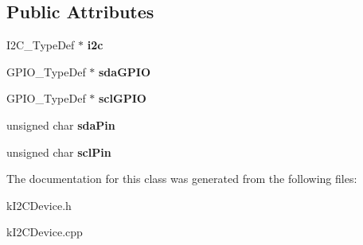 \subsection*{Public Attributes}
\begin{DoxyCompactItemize}
\item 
I2\+C\+\_\+\+Type\+Def $\ast$ {\bfseries i2c}\hypertarget{classkI2CDeviceHardware_ace7b414f13cbd3e93e904c661cc02e35}{}\label{classkI2CDeviceHardware_ace7b414f13cbd3e93e904c661cc02e35}

\item 
G\+P\+I\+O\+\_\+\+Type\+Def $\ast$ {\bfseries sda\+G\+P\+IO}\hypertarget{classkI2CDeviceHardware_af0228a16a473dfdd0f33ae6f60eb6cfc}{}\label{classkI2CDeviceHardware_af0228a16a473dfdd0f33ae6f60eb6cfc}

\item 
G\+P\+I\+O\+\_\+\+Type\+Def $\ast$ {\bfseries scl\+G\+P\+IO}\hypertarget{classkI2CDeviceHardware_ab4433caa4d8c1b7c460fd0c356ce87c0}{}\label{classkI2CDeviceHardware_ab4433caa4d8c1b7c460fd0c356ce87c0}

\item 
unsigned char {\bfseries sda\+Pin}\hypertarget{classkI2CDeviceHardware_ac244794bc64bf54acf12bc43242b7a13}{}\label{classkI2CDeviceHardware_ac244794bc64bf54acf12bc43242b7a13}

\item 
unsigned char {\bfseries scl\+Pin}\hypertarget{classkI2CDeviceHardware_a33ccd2758d40a159e023e6f338726fa8}{}\label{classkI2CDeviceHardware_a33ccd2758d40a159e023e6f338726fa8}

\end{DoxyCompactItemize}


The documentation for this class was generated from the following files\+:\begin{DoxyCompactItemize}
\item 
k\+I2\+C\+Device.\+h\item 
k\+I2\+C\+Device.\+cpp\end{DoxyCompactItemize}
